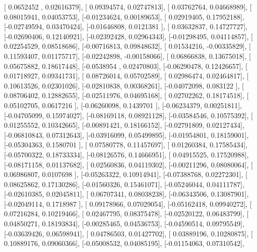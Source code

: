 \documentclass{article}
\begin{document}
       [ 0.0652452 ,  0.02616379],
       [ 0.09394574,  0.02747813],
       [ 0.03762764,  0.04668989],
       [ 0.08015941,  0.04053753],
       [-0.01234624,  0.00189653],
       [ 0.02919405,  0.17952188],
       [-0.02749594,  0.03470424],
       [-0.01646808,  0.0121381 ],
       [ 0.03632837,  0.14727727],
       [-0.02690406,  0.12140921],
       [-0.02392428,  0.02964343],
       [-0.01298495,  0.04114857],
       [ 0.02254529,  0.08518686],
       [-0.00716813,  0.09848632],
       [ 0.01534216, -0.00335829],
       [ 0.11593407,  0.01175717],
       [-0.02242898, -0.00158066],
       [ 0.06866838,  0.13675018],
       [ 0.05675882,  0.18617448],
       [-0.0538954 ,  0.02470803],
       [-0.06290478,  0.12426657],
       [ 0.01718927,  0.09341731],
       [ 0.08726014,  0.05702589],
       [ 0.02986474,  0.02464817],
       [ 0.10613526,  0.02301026],
       [-0.02810838,  0.00368261],
       [-0.04072098,  0.083122  ],
       [ 0.08706402,  0.12882655],
       [-0.02511976,  0.04695168],
       [ 0.02702262,  0.18174518],
       [ 0.05102705,  0.0617216 ],
       [-0.06260098,  0.1439701 ],
       [-0.06234379,  0.00251811],
       [-0.04705099,  0.15974027],
       [-0.08169118,  0.08921128],
       [-0.03584546,  0.10575392],
       [ 0.01255552,  0.10342665],
       [-0.00891421,  0.18166152],
       [-0.02791809,  0.02127434],
       [-0.06810843,  0.07312643],
       [-0.03916099,  0.05499895],
       [-0.01954801,  0.18159001],
       [-0.05304363,  0.1580701 ],
       [ 0.07580778,  0.11457697],
       [ 0.01260384,  0.17585434],
       [-0.05700322,  0.18733334],
       [-0.08126576,  0.14666951],
       [ 0.04915525,  0.17520988],
       [-0.08171158,  0.01137682],
       [ 0.02560836,  0.04119302],
       [-0.00211296,  0.08080064],
       [ 0.06986807,  0.0107698 ],
       [-0.05263322,  0.10914941],
       [-0.07388768,  0.02272301],
       [ 0.08625862,  0.17130286],
       [-0.01560326,  0.15461071],
       [-0.05246044,  0.04111787],
       [-0.02610385,  0.02045811],
       [ 0.06707341,  0.08038238],
       [-0.06343506,  0.13087901],
       [-0.02049114,  0.1718987 ],
       [ 0.09178966,  0.07029054],
       [-0.05162418,  0.09940272],
       [ 0.07216284,  0.10219466],
       [ 0.02467795,  0.08375478],
       [-0.02520122,  0.06483799],
       [ 0.04850271,  0.18193834],
       [-0.00285465,  0.04536753],
       [-0.04590514,  0.09795549],
       [-0.03639426,  0.06598941],
       [ 0.04786503,  0.01427702],
       [ 0.03889196,  0.10280875],
       [ 0.10889176,  0.09060366],
       [-0.05008532,  0.04085195],
       [-0.01154063,  0.07310542],
\end{document}
